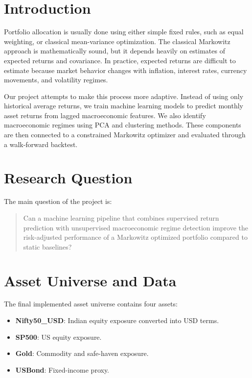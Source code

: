 \documentclass[11pt,a4paper]{article}
\begin{document}
\section{Introduction}

Portfolio allocation is usually done using either simple fixed rules, such as equal weighting, or classical mean-variance optimization. The classical Markowitz approach is mathematically sound, but it depends heavily on estimates of expected returns and covariance. In practice, expected returns are difficult to estimate because market behavior changes with inflation, interest rates, currency movements, and volatility regimes.

Our project attempts to make this process more adaptive. Instead of using only historical average returns, we train machine learning models to predict monthly asset returns from lagged macroeconomic features. We also identify macroeconomic regimes using PCA and clustering methods. These components are then connected to a constrained Markowitz optimizer and evaluated through a walk-forward backtest.

\section{Research Question}

The main question of the project is:

\begin{quote}
Can a machine learning pipeline that combines supervised return prediction with unsupervised macroeconomic regime detection improve the risk-adjusted performance of a Markowitz optimized portfolio compared to static baselines?
\end{quote}

\section{Asset Universe and Data}

The final implemented asset universe contains four assets:

\begin{itemize}[leftmargin=*]
    \item \textbf{Nifty50\_USD}: Indian equity exposure converted into USD terms.
    \item \textbf{SP500}: US equity exposure.
    \item \textbf{Gold}: Commodity and safe-haven exposure.
    \item \textbf{USBond}: Fixed-income proxy.
\end{itemize}
\end{document}
